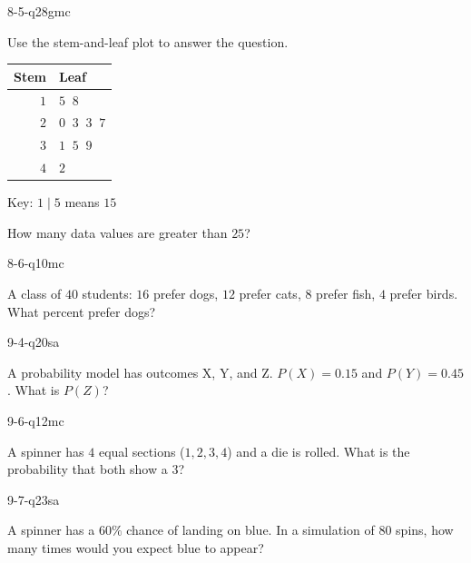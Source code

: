 \begin{practiceQuestion}{8-5-q28}{gmc}
\begin{questionText}
Use the stem-and-leaf plot to answer the question.

\begin{center}
\begin{tabular}{r|l}
\textbf{Stem} & \textbf{Leaf} \\
\hline
$1$ & $5\;\;8$ \\
$2$ & $0\;\;3\;\;3\;\;7$ \\
$3$ & $1\;\;5\;\;9$ \\
$4$ & $2$
\end{tabular}

Key: $1 \mid 5$ means $15$
\end{center}

How many data values are greater than $25$?
\end{questionText}
\end{practiceQuestion}

\begin{practiceQuestion}{8-6-q10}{mc}
\begin{questionText}
A class of $40$ students: $16$ prefer dogs, $12$ prefer cats, $8$ prefer fish, $4$ prefer birds. What percent prefer dogs?
\end{questionText}
\end{practiceQuestion}

\begin{practiceQuestion}{9-4-q20}{sa}
\begin{questionText}
A probability model has outcomes X, Y, and Z. $P(X) = 0.15$ and $P(Y) = 0.45$. What is $P(Z)$?
\end{questionText}
\end{practiceQuestion}

\begin{practiceQuestion}{9-6-q12}{mc}
\begin{questionText}
A spinner has $4$ equal sections ($1, 2, 3, 4$) and a die is rolled. What is the probability that both show a $3$?
\end{questionText}
\end{practiceQuestion}

\begin{practiceQuestion}{9-7-q23}{sa}
\begin{questionText}
A spinner has a $60\%$ chance of landing on blue. In a simulation of $80$ spins, how many times would you expect blue to appear?
\end{questionText}
\end{practiceQuestion}

